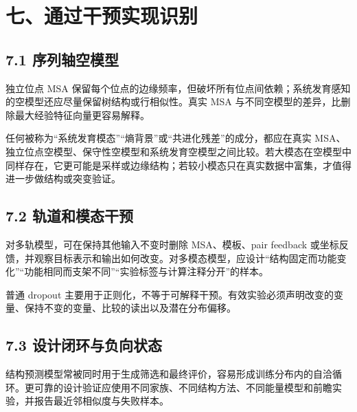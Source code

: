 \documentclass[10pt]{article}
\begin{document}
\section*{七、通过干预实现识别}


\subsection*{7.1 序列轴空模型}


独立位点 MSA 保留每个位点的边缘频率，但破坏所有位点间依赖；系统发育感知的空模型还应尽量保留树结构或行相似性。真实 MSA 与不同空模型的差异，比删除最大经验特征向量更容易解释。\par

任何被称为“系统发育模态”“熵背景”或“共进化残差”的成分，都应在真实 MSA、独立位点空模型、保守性空模型和系统发育空模型之间比较。若大模态在空模型中同样存在，它更可能是采样或边缘结构；若较小模态只在真实数据中富集，才值得进一步做结构或突变验证。\par

\subsection*{7.2 轨道和模态干预}


对多轨模型，可在保持其他输入不变时删除 MSA、模板、pair feedback 或坐标反馈，并观察目标表示和输出如何改变。对多模态模型，应设计“结构固定而功能变化”“功能相同而支架不同”“实验标签与计算注释分开”的样本。\par

普通 dropout 主要用于正则化，不等于可解释干预。有效实验必须声明改变的变量、保持不变的变量、比较的读出以及潜在分布偏移。\par

\subsection*{7.3 设计闭环与负向状态}


结构预测模型常被同时用于生成筛选和最终评价，容易形成训练分布内的自洽循环。更可靠的设计验证应使用不同家族、不同结构方法、不同能量模型和前瞻实验，并报告最近邻相似度与失败样本。\par
\end{document}

